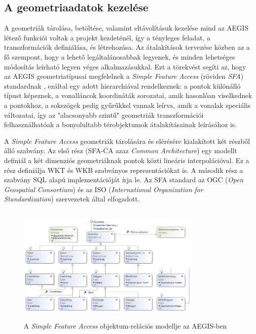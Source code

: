 \subsection{A geometriaadatok kezelése}
A geometriák tárolása, betöltése, valamint eltávolításuk kezelése mind az AEGIS létező funkciói voltak a projekt kezdeténél, így a tényleges feladat, a transzformációk definiálása, és létrehozása.
Az átalakítások tervezése közben az a fő szempont, hogy a lehető legáltalánosabbak legyenek, és minden lehetséges módosítás leírható legyen véges alkalmazásukkal. Ezt a törekvést segíti az, hogy az AEGIS geometriatípusai megfelelnek a \emph{Simple Feature Access} (röviden \emph{SFA}) standardnak \cite{sfa}, ezáltal egy adott hierarchiával rendelkeznek: a pontok különálló típust képeznek, a vonalláncok koordináták sorozatai, amik hasonlóan viselkednek a pontokhoz, a sokszögek pedig gyűrűkkel vannak leírva, amik a vonalak speciális változatai, így az "alacsonyabb szintű" geometriák transzformációi felhasználhatóak a bonyolultabb térobjektumok átalakításainak leírásához is. 
\begin{note}
A \emph{Simple Feature Access} geometriák tárolására és elérésére kialakított két részből álló szabvány. Az első rész (SFA-CA azaz \emph{Common Architecture}) egy modellt definiál a két dimenziós geometriáknak pontok közti lineáris interpolációval. Ez a rész definiálja WKT és WKB szabványos reprezentációkat is. A második rész a szabvány SQL alapú implementációját írja le. Az SFA standard az OGC (\emph{Open Geospatial Consortium}) és az ISO (\emph{International Organization for Standardization}) szervezetek által elfogadott.
\begin{figure}[H]
	\centering
	\includegraphics[width=0.8\textwidth,height=220px]{images/sfa.png}
	\caption{A \emph{Simple Feature Access} objektum-relációs modellje az AEGIS-ben}
	\label{fig:picture-8}
\end{figure}
\end{note}

